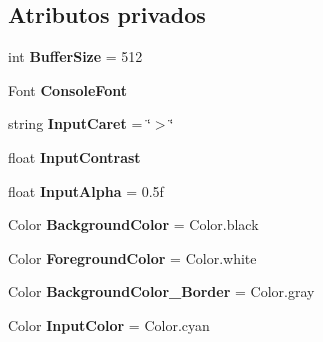 \subsection*{Atributos privados}
\begin{DoxyCompactItemize}
\item 
\mbox{\label{class_command_terminal_1_1_terminal_a4b1e8e1cd48d094d5986a345f718fac4}} 
int {\bfseries Buffer\+Size} = 512
\item 
\mbox{\label{class_command_terminal_1_1_terminal_aee5601bc023254a0871f3f328ca233b6}} 
Font {\bfseries Console\+Font}
\item 
\mbox{\label{class_command_terminal_1_1_terminal_a2ea061edabf6e96ef3eb463a3b61983c}} 
string {\bfseries Input\+Caret} = \char`\"{}$>$\char`\"{}
\item 
\mbox{\label{class_command_terminal_1_1_terminal_aa917209ac1c8faaed2e85e798a6805bd}} 
float {\bfseries Input\+Contrast}
\item 
\mbox{\label{class_command_terminal_1_1_terminal_a08b569ce517750d9974d6b95729c5b01}} 
float {\bfseries Input\+Alpha} = 0.\+5f
\item 
\mbox{\label{class_command_terminal_1_1_terminal_a76739e160826ab07fbfd5c6ec857c51a}} 
Color {\bfseries Background\+Color} = Color.\+black
\item 
\mbox{\label{class_command_terminal_1_1_terminal_a8086cdfb3406c8a9859c0ba4c8c5d434}} 
Color {\bfseries Foreground\+Color} = Color.\+white
\item 
\mbox{\label{class_command_terminal_1_1_terminal_a15801ce3f22a38753947b842a2ea2c2b}} 
Color {\bfseries Background\+Color\+\_\+\+Border} = Color.\+gray
\item 
\mbox{\label{class_command_terminal_1_1_terminal_a7418337b7236b437b65f922aa9ae2b68}} 
Color {\bfseries Input\+Color} = Color.\+cyan

\end{DoxyCompactItemize}
